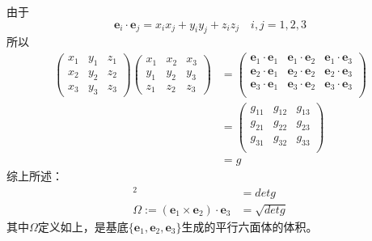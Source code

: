 由于
\begin{equation}
    \boldsymbol{e}_i\cdot \boldsymbol{e}_j = x_ix_j + y_iy_j + z_iz_j \quad i,j = 1,2,3
\end{equation}
所以
\begin{equation}
    \begin{aligned}
        \left(\begin{array}{ccc}
        x_1 & y_1 & z_1  \\
        x_2 & y_2 & z_2  \\
        x_3 & y_3 & z_3
    \end{array} \right) \left(\begin{array}{ccc}
        x_1 & x_2 & x_3  \\
        y_1 & y_2 & y_3  \\
        z_1 & z_2 & z_3
    \end{array}\right) &= \left( \begin{array}{ccc}
         \boldsymbol{e}_1 \cdot \boldsymbol{e}_1& \boldsymbol{e}_1 \cdot \boldsymbol{e}_2 & \boldsymbol{e}_1 \cdot \boldsymbol{e}_3 \\
         \boldsymbol{e}_2 \cdot \boldsymbol{e}_1& \boldsymbol{e}_2 \cdot \boldsymbol{e}_2 & \boldsymbol{e}_2 \cdot \boldsymbol{e}_3 \\
         \boldsymbol{e}_3 \cdot \boldsymbol{e}_1& \boldsymbol{e}_3 \cdot \boldsymbol{e}_2 & \boldsymbol{e}_3 \cdot \boldsymbol{e}_3 \\
    \end{array}\right) \\
   & = \left(\begin{array}{ccc}
        g_{11} & g_{12} & g_{13}  \\
         g_{21} & g_{22} & g_{23}  \\
         g_{31} & g_{32} & g_{33}  \\
    \end{array}\right) \\
    & = g
    \end{aligned}
\end{equation}
综上所述：
\begin{align}
    [(\boldsymbol{e}_1 \times \boldsymbol{e}_2 ) \cdot \boldsymbol{e}_3]^2 &= detg  \\
    \Omega := (\boldsymbol{e}_1 \times \boldsymbol{e}_2 ) \cdot \boldsymbol{e}_3 &= \sqrt{det g}
\end{align}
其中$\Omega$定义如上，是基底$\{\boldsymbol{e}_1,\boldsymbol{e}_2,\boldsymbol{e}_3\}$生成的平行六面体的体积。
